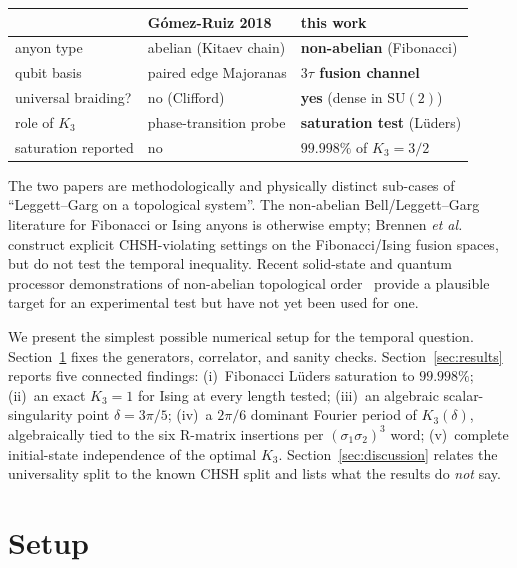 \documentclass[aps,prx,reprint,amsmath,amssymb,floatfix,nofootinbib,superscriptaddress]{revtex4-2}
\begin{document}
\begin{center}\small
\begin{tabular}{lll}
\toprule
                       & G\'omez-Ruiz 2018~\cite{GomezRuiz2018} & this work \\
\midrule
anyon type             & abelian (Kitaev chain) & \textbf{non-abelian} (Fibonacci) \\
qubit basis            & paired edge Majoranas  & \textbf{$3\tau$ fusion channel} \\
universal braiding?    & no (Clifford)          & \textbf{yes} (dense in $\mathrm{SU}(2)$) \\
role of $K_{3}$        & phase-transition probe & \textbf{saturation test} (L\"uders) \\
saturation reported    & no                     & \textbf{$99.998\%$} of $K_{3}=3/2$ \\
\bottomrule
\end{tabular}
\end{center}

\noindent The two papers are methodologically and physically distinct
sub-cases of ``Leggett--Garg on a topological system''. The
non-abelian Bell/Leggett--Garg literature for Fibonacci or Ising
anyons is otherwise empty; Brennen \emph{et al.}~\cite{Brennen2009}
construct explicit CHSH-violating settings on the Fibonacci/Ising
fusion spaces, but do not test the temporal inequality. Recent
solid-state and quantum processor demonstrations of non-abelian
topological order~\cite{Andersen2023,Iqbal2024,Xu2024,Minev2025}
provide a plausible target for an experimental test but have not yet
been used for one.

We present the simplest possible numerical setup for the temporal
question. Section~\ref{sec:setup} fixes the generators, correlator,
and sanity checks. Section~\ref{sec:results} reports five connected
findings: (i)~Fibonacci L\"uders saturation to $99.998\%$;
(ii)~an exact $K_{3}=1$ for Ising at every length tested;
(iii)~an algebraic scalar-singularity point $\delta = 3\pi/5$;
(iv)~a $2\pi/6$ dominant Fourier period of $K_{3}(\delta)$,
algebraically tied to the six R-matrix insertions per
$(\sigma_{1}\sigma_{2})^{3}$ word;
(v)~complete initial-state independence of the optimal $K_{3}$.
Section~\ref{sec:discussion} relates the universality split to the
known CHSH split and lists what the results do \emph{not} say.

\section{Setup}
\label{sec:setup}
\end{document}
